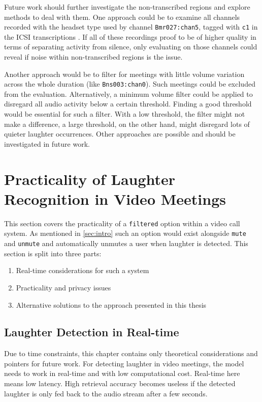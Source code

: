 \documentclass[bsc,frontabs,parskip,deptreport]{infthesis}
\begin{document}
Future work should further investigate the non-transcribed regions and explore methods to deal with them.
One approach could be to examine all channels recorded with the headset type used by channel \verb|Bmr027:chan5|, tagged with \texttt{c1} in the ICSI transcriptions \citep{morgan2001meeting, icsi-naming-conventions}. If all of these recordings proof to be of higher quality in terms of separating activity from silence, only evaluating on those channels could reveal if noise within non-transcribed regions is the issue.

Another approach would be to filter for meetings with little volume variation across the whole duration (like \verb|Bns003:chan0|).
Such meetings could be excluded from the evaluation. 
Alternatively, a minimum volume filter could be applied to disregard all audio activity below a certain threshold.
Finding a good threshold would be essential for such a filter. With a low threshold, the filter might not make a difference, a large threshold, on the other hand, might disregard lots of quieter laughter occurrences. 
Other approaches are possible and should be investigated in future work.



\chapter{Practicality of Laughter Recognition in Video Meetings} \label{cha:practicality}
This section covers the practicality of a \texttt{filtered} option within a video call system. As mentioned in \autoref{sec:intro} such an option would exist alongside \texttt{mute} and \texttt{unmute} and automatically unmutes a user when laughter is detected. 
This section is split into three parts: 
\begin{enumerate}
    \item Real-time considerations for such a system
    \item Practicality and privacy issues 
    \item Alternative solutions to the approach presented in this thesis
\end{enumerate}

\section{Laughter Detection in Real-time} \label{sec:real-time}
Due to time constraints, this chapter contains only theoretical considerations and pointers for future work. 
For detecting laughter in video meetings, the model needs to work in real-time and with low computational cost. Real-time here means low latency.
High retrieval accuracy becomes useless if the detected laughter is only fed back to the audio stream after a few seconds.
\end{document}
